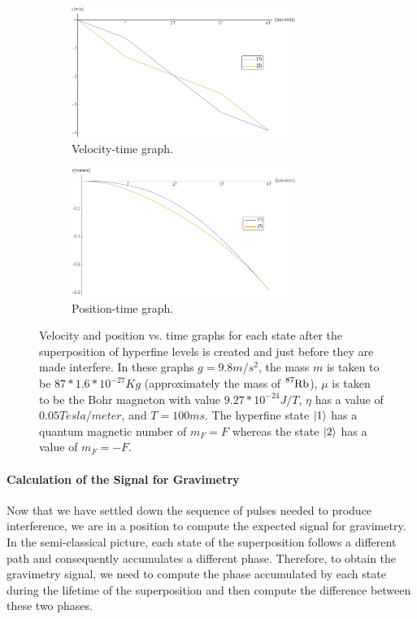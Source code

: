 \documentclass{article}
\begin{document}
\begin{figure}
    \centering
    \begin{subfigure}{1\textwidth}
        \centering
        \includegraphics[width=0.8\textwidth]{velocidad.png}
        \caption{Velocity-time graph.}
        \label{velocity_graph}
    \end{subfigure}
    \hfill
    \begin{subfigure}{1\textwidth}
        \centering
        \includegraphics[width=0.8\textwidth]{posicion.png}
        \caption{Position-time graph.}
        \label{position_graph}
    \end{subfigure}
    \caption{Velocity and position vs. time graphs for each state after the superposition of hyperfine levels is created and just before they are made interfere. In these graphs $g=9.8m/s^2$, the mass $m$ is taken to be $87*1.6*10^{-27} Kg$ (approximately the mass of $\ce{^{87}_{}Rb}$), $\mu$ is taken to be the Bohr magneton with value $9.27*10^{-24} J/T$, $\eta$ has a value of $0.05 Tesla/meter$, and $T=100ms$. 
    The hyperfine state $\ket{1}$ has a quantum magnetic number of $m_{F}=F$ whereas the state $\ket{2}$ has a value of $m_{F}=-F$.}
    \label{velocity_position_graphs}
\end{figure}

\paragraph{Calculation of the Signal for Gravimetry}
Now that we have settled down the sequence of pulses needed to produce interference, we are in a position to compute the expected signal for gravimetry. In the semi-classical picture, each state of the superposition follows a different path and consequently accumulates a different phase. Therefore, to obtain the gravimetry signal, we need to compute the phase accumulated by each state during the lifetime of the superposition and then compute the difference between these two phases. 
\end{document}
